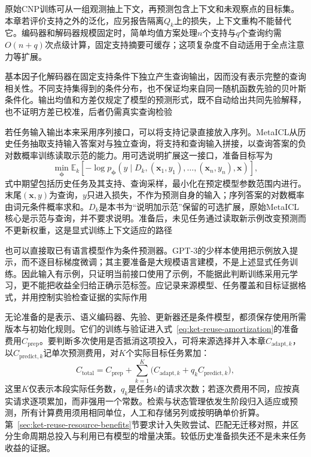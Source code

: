 原始CNP训练可从一组观测抽上下文，再预测包含上下文和未观察点的目标集。本章若评价支持之外的泛化，应另报告隔离$Q_k$上的损失，上下文重构不能替代它。编码器和解码器规模固定时，简单均值方案处理$n$个支持与$q$个查询约需$O(n+q)$次点级计算，固定支持摘要可缓存；这项复杂度不自动适用于全点注意力等扩展。

基本因子化解码器在固定支持条件下独立产生查询输出，因而没有表示完整的查询相关性。不同支持集得到的条件分布，也不保证均来自同一随机函数先验的贝叶斯条件化。输出均值和方差仅规定了模型的预测形式，既不自动给出共同先验解释，也不证明方差已校准，后者仍需真实查询检验

若任务输入输出本来采用序列接口，可以将支持记录直接放入序列。MetaICL从历史任务抽取支持输入答案对与独立查询，将支持和查询输入拼接，以查询答案的负对数概率训练读取示范的能力。用可选说明扩展这一接口，准备目标写为
\begin{equation}
  \min_{\bm\phi}
  \mathbb E_k\left[
    -\log p_{\bm\phi}
       (y\mid D_k,(\bm x_1,y_1),\ldots,(\bm x_n,y_n),\bm x)
  \right],
  \label{eq:ket-transfer-metaicl}
\end{equation}
式中期望包括历史任务及其支持、查询采样，最小化在预定模型参数范围内进行。末尾$(\bm x,y)$为查询，$y$只进入损失，不作为预测自身的输入；序列答案的对数概率由词元条件概率求和。$D_k$是本书为“说明加示范”保留的可选扩展，原始MetaICL核心是示范与查询，并不要求说明。准备后，未见任务通过读取新示例改变预测而不更新权重，这是显式训练上下文适应的路径

也可以直接取已有语言模型作为条件预测器。GPT-3的少样本使用把示例放入提示，而不逐目标梯度微调；其主要准备是大规模语言建模，不是上述显式任务训练。因此输入有示例，只证明当前接口使用了示例，不能据此判断训练采用元学习，更不能把收益全归给正确示范标签。应记录来源模型、任务覆盖和目标证据格式，并用控制实验检查证据的实际作用

无论准备的是表示、语义编码器、先验、更新器还是条件模型，都须保存使用所需版本与初始化规则。它们的训练与验证进入式~\eqref{eq:ket-reuse-amortization}的准备费用$C_{\mathrm{prep}}$。要判断多次使用是否抵消这项投入，可将来源选择并入本章$C_{\mathrm{adapt},k}$，以$C_{\mathrm{predict},k}$记单次预测费用，对$K$个实际目标任务累加：
\begin{equation}
  C_{\mathrm{total}}
    =C_{\mathrm{prep}}
     +\sum_{k=1}^{K}
       \bigl(C_{\mathrm{adapt},k}+q_kC_{\mathrm{predict},k}\bigr),
  \label{eq:ket-transfer-total-cost}
\end{equation}
这里$K$仅表示本段实际任务数，$q_k$是任务$k$的请求次数；若逐次费用不同，应按真实请求逐项累加，而非强用一个常数。检索与状态管理依发生阶段归入适应或预测，所有计算费用须用相同单位，人工和存储另列或按明确单价折算。第~\ref{sec:ket-reuse-resource-benefits}节要求计入失败尝试、匹配无迁移对照，并区分生命周期总投入与利用已有模型的增量决策。较低历史准备损失还不是未来任务收益的证据。

